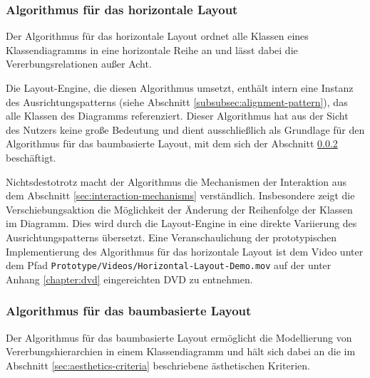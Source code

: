 
\subsubsection{Algorithmus für das horizontale Layout}
\label{subsubsec:horizontal-layout-algorithm}

Der Algorithmus für das horizontale Layout ordnet alle Klassen eines Klassendiagramms in eine horizontale Reihe an und lässt dabei die Vererbungsrelationen außer Acht.

Die Layout-Engine, die diesen Algorithmus umsetzt, enthält intern eine Instanz des Ausrichtungspatterns (siehe Abschnitt \ref{subsubsec:alignment-pattern}), das alle Klassen des Diagramms referenziert. Dieser Algorithmus hat aus der Sicht des Nutzers keine große Bedeutung und dient ausschließlich als Grundlage für den Algorithmus für das baumbasierte Layout, mit dem sich der Abschnitt \ref{subsubsec:tree-layout-algorithm} beschäftigt.

Nichtsdestotrotz macht der Algorithmus die Mechanismen der Interaktion aus dem Abschnitt \ref{sec:interaction-mechanisms} verständlich. Insbesondere zeigt die Verschiebungsaktion die Möglichkeit der Änderung der Reihenfolge der Klassen im Diagramm. Dies wird durch die Layout-Engine in eine direkte Variierung des Ausrichtungspatterns übersetzt. Eine Veranschaulichung der prototypischen Implementierung des Algorithmus für das horizontale Layout ist dem Video unter dem Pfad \texttt{Prototype/Videos/Hori\-zon\-tal-\-Lay\-out-\-De\-mo.mov} auf der unter Anhang \ref{chapter:dvd} eingereichten DVD zu entnehmen.

\subsubsection{Algorithmus für das baumbasierte Layout}
\label{subsubsec:tree-layout-algorithm}

Der Algorithmus für das baumbasierte Layout ermöglicht die Modellierung von Vererbungshierarchien in einem Klassendiagramm und hält sich dabei an die im Abschnitt \ref{sec:aesthetics-criteria} beschriebene ästhetischen Kriterien.

